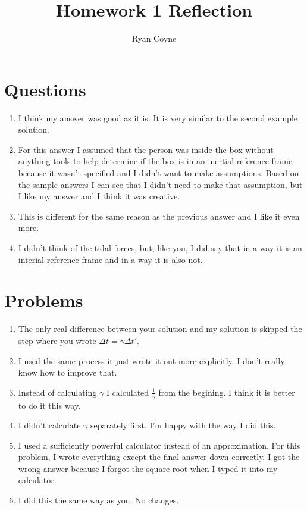 \documentclass[12pt]{article}
\begin{document}
    \title{Homework 1 Reflection}
    \author{Ryan Coyne}
    \maketitle
    
    \section{Questions}
    \begin{enumerate}
        \item I think my answer was good as it is. It is very similar to the second example solution.
        \item For this answer I assumed that the person was inside the box without anything tools to help determine if the box is in an inertial reference frame because it wasn't specified and I didn't want to make assumptions. Based on the sample answers I can see that I didn't need to make that assumption, but I like my answer and I think it was creative.
        \item This is different for the same reason as the previous answer and I like it even more.
        \item I didn't think of the tidal forces, but, like you, I did say that in a way it is an interial reference frame and in a way it is also not.
    \end{enumerate}

    \section{Problems}
    \begin{enumerate}
        \item  The only real difference between your solution and my solution is skipped the step where you wrote \(\Delta t = \gamma\Delta t'\). 
        \item I used the same process it just wrote it out more explicitly. I don't really know how to improve that.
        \item Instead of calculating \(\gamma\) I calculated \(\frac{1}{\gamma}\) from the begining. I think it is better to do it this way.
        \item I didn't calculate \(\gamma\) separately first. I'm happy with the way I did this.
        \item I used a sufficiently powerful calculator instead of an approximation. For this problem, I wrote everything except the final answer down correctly. I got the wrong answer because I forgot the square root when I typed it into my calculator. 
        \item I did this the same way as you. No changes.
    \end{enumerate}
\end{document}
